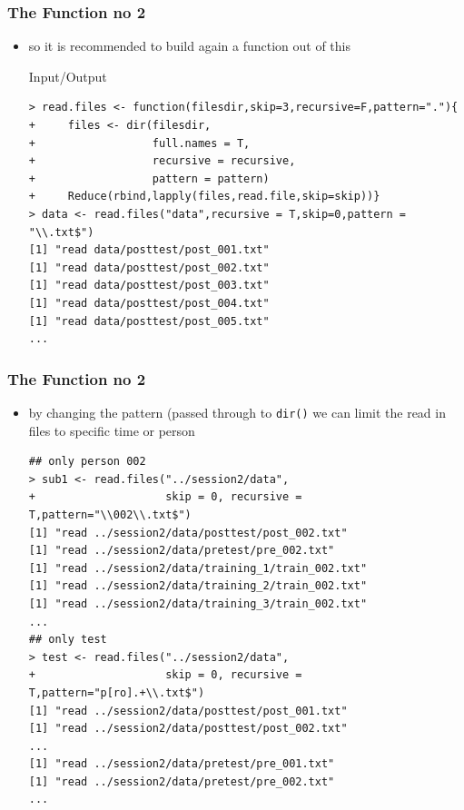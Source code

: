 \documentclass[xcolor={table},c]{beamer}
\begin{document}
\begin{frame}[fragile]\frametitle{The Function no 2}
  \begin{itemize}
  \item so it is recommended to build again a function out of this
    \begin{exampleblock}{Input/Output}\scriptsize
\begin{verbatim}
> read.files <- function(filesdir,skip=3,recursive=F,pattern="."){
+     files <- dir(filesdir,
+                  full.names = T,
+                  recursive = recursive,
+                  pattern = pattern)
+     Reduce(rbind,lapply(files,read.file,skip=skip))}
> data <- read.files("data",recursive = T,skip=0,pattern = "\\.txt$")
[1] "read data/posttest/post_001.txt"
[1] "read data/posttest/post_002.txt"
[1] "read data/posttest/post_003.txt"
[1] "read data/posttest/post_004.txt"
[1] "read data/posttest/post_005.txt"
...
\end{verbatim}
    \end{exampleblock}
  \end{itemize}
\end{frame}



\begin{frame}[fragile]\frametitle{The Function no 2}
  \begin{itemize}
  \item by changing the pattern (passed through to \texttt{dir()} we can limit the read in files to specific time or person\tiny
\begin{verbatim}
## only person 002
> sub1 <- read.files("../session2/data",
+                    skip = 0, recursive = T,pattern="\\002\\.txt$")
[1] "read ../session2/data/posttest/post_002.txt"
[1] "read ../session2/data/pretest/pre_002.txt"
[1] "read ../session2/data/training_1/train_002.txt"
[1] "read ../session2/data/training_2/train_002.txt"
[1] "read ../session2/data/training_3/train_002.txt"
...
## only test
> test <- read.files("../session2/data",
+                    skip = 0, recursive = T,pattern="p[ro].+\\.txt$")
[1] "read ../session2/data/posttest/post_001.txt"
[1] "read ../session2/data/posttest/post_002.txt"
...
[1] "read ../session2/data/pretest/pre_001.txt"
[1] "read ../session2/data/pretest/pre_002.txt"
...
\end{verbatim}
  \end{itemize}
\end{frame}
\end{document}
